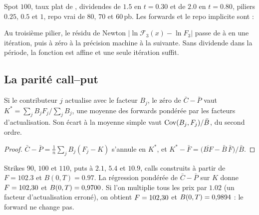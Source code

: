 \begin{example}\label{ex-bootstrap}
Spot $100$, taux plat de , dividendes de $\num{1.5}$ en $t=\num{0.30}$ et de $\num{2.0}$ en $t=\num{0.80}$,
piliers $\num{0.25}$, $\num{0.5}$ et $1$, repo vrai de $80$, $70$ et $60$\,pb. Les forwards et le repo implicite sont :
\begin{center}\end{center}
Au troisième pilier, le résidu de Newton $|\ln\mathcal F_3(x)-\ln F_3|$ passe de \vNewtonA{} à \vNewtonB{} en une
itération, puis à zéro à la précision machine à la suivante. Sans dividende dans la période, la fonction est affine et
une seule itération suffit.
\end{example}

\subsection{La parité call--put}\label{app-parity}
\begin{lemma}
Si le contributeur $j$ actualise avec le facteur $B_j$, le zéro de $\bar C-\bar P$ vaut
$K^\ast=\sum_jB_jF_j\big/\sum_jB_j$, une moyenne des forwards pondérée par les facteurs d'actualisation. Son écart à
la moyenne simple vaut $\operatorname{Cov}(B_j, F_j)/\bar B$, du second ordre.
\end{lemma}
\begin{proof}
$\bar C-\bar P=\frac1n\sum_jB_j(F_j-K)$ s'annule en $K^\ast$, et
$K^\ast-\bar F=\bigl(\overline{BF}-\bar B\,\bar F\bigr)/\bar B$.
\end{proof}

\begin{example}[Parité]\label{ex-parity}
Strikes $90$, $100$ et $110$, puts à $\num{2.1}$, $\num{5.4}$ et $\num{10.9}$, calls construits à partir de
$F=\num{102.3}$ et $B(0, T)=\num{0.97}$. La régression pondérée de $\bar C-\bar P$ sur $K$ donne $F=\num{102.30}$ et
$B(0, T)=\num{0.9700}$. Si l'on multiplie tous les prix par $\num{1.02}$ (un facteur d'actualisation erroné), on obtient
$F=\num{102.30}$ et $B(0, T)=\num{0.9894}$ : le forward ne change pas.
\end{example}

